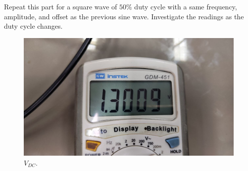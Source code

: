 \documentclass[11pt]{article}
\newcommand{\PicScale}{0.2}
\begin{document}
\begin{question}
\begin{subquestion}{Repeat this part for a square wave of $50\%$ duty cycle with a same frequency, amplitude, and offset as the previous sine wave. Investigate the readings as the duty cycle changes.}
{            \begin{figure}[H]
                \begin{center}
                    \includegraphics[scale=\PicScale]{Fig/35.jpeg}
                    \caption{$V_{DC}$.}
                \end{center}
            \end{figure}
        }
    \end{subquestion}

\end{question}

\end{document}

